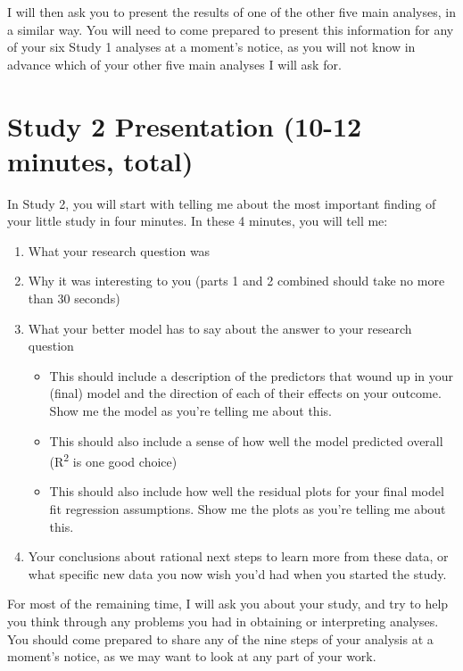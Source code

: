 \documentclass[]{book}
\providecommand{\tightlist}{%
  \setlength{\itemsep}{0pt}\setlength{\parskip}{0pt}}
\theoremstyle{definition}
\theoremstyle{definition}
\theoremstyle{definition}
\theoremstyle{remark}
\begin{document}
I will then ask you to present the results of one of the other five main
analyses, in a similar way. You will need to come prepared to present
this information for any of your six Study 1 analyses at a moment's
notice, as you will not know in advance which of your other five main
analyses I will ask for.

\hypertarget{study-2-presentation-10-12-minutes-total}{%
\section{Study 2 Presentation (10-12 minutes,
total)}\label{study-2-presentation-10-12-minutes-total}}

In Study 2, you will start with telling me about the most important
finding of your little study in four minutes. In these 4 minutes, you
will tell me:

\begin{enumerate}
\def\labelenumi{\alph{enumi}.}
\tightlist
\item
  What your research question was
\item
  Why it was interesting to you (parts 1 and 2 combined should take no
  more than 30 seconds)
\item
  What your better model has to say about the answer to your research
  question

  \begin{itemize}
  \tightlist
  \item
    This should include a description of the predictors that wound up in
    your (final) model and the direction of each of their effects on
    your outcome. Show me the model as you're telling me about this.
  \item
    This should also include a sense of how well the model predicted
    overall (R\textsuperscript{2} is one good choice)
  \item
    This should also include how well the residual plots for your final
    model fit regression assumptions. Show me the plots as you're
    telling me about this.
  \end{itemize}
\item
  Your conclusions about rational next steps to learn more from these
  data, or what specific new data you now wish you'd had when you
  started the study.
\end{enumerate}

For most of the remaining time, I will ask you about your study, and try
to help you think through any problems you had in obtaining or
interpreting analyses. You should come prepared to share any of the nine
steps of your analysis at a moment's notice, as we may want to look at
any part of your work.
\end{document}
